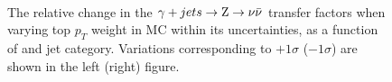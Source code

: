 \begin{figure}[]
  \centering
   ~~
  \\

  \caption{\label{fig:tfSyst_topPt_gjToZinv} The relative change in the $\gj \rightarrow \znunu$ transfer
  factors when varying top $p_{T}$ weight in MC within its uncertainties, as a function of \scalht and jet category. 
  Variations corresponding to $+1\sigma$ ($-1\sigma$) are shown in the left (right) figure. 
  }
\end{figure}

